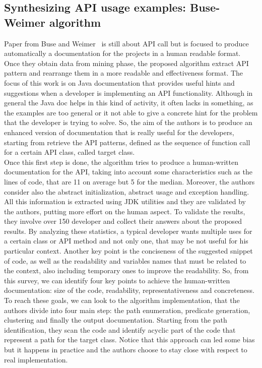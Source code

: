 \subsection{Synthesizing API usage examples: Buse-Weimer algorithm}
Paper from Buse and Weimer~\cite{buse_synthesizing_2012} is still about API call but is focused to produce automatically a documentation for the projects in a human readable format.
Once they obtain data from mining phase, the proposed algorithm extract API pattern and rearrange them in a more readable and effectiveness format. The focus of this work is on Java documentation that provides useful hints and suggestions when a developer is implementing an API functionality. Although in general the Java doc helps in this kind of activity, it often lacks in something, as the examples are too general or it not able to give a concrete hint for the problem that the developer is trying to solve. So, the aim of the authors is to produce an enhanced version of documentation that is really useful for the developers, starting from retrieve the API patterns, defined as the sequence of function call for a certain API class, called target class. \\
Once this first step is done, the algorithm tries to produce a human-written documentation for the API, taking into account some characteristics such as the lines of code, that are 11 on average but 5 for the median. Moreover, the authors consider also the abstract initialization, abstract usage and exception handling. All this information is extracted using JDK utilities and they are validated by the authors, putting more effort on the human aspect. To validate the results, they involve over 150 developer and collect their answers about the proposed results. By analyzing these statistics, a typical developer wants multiple uses for a certain class or API method and not only one, that may be not useful for his particular context. Another key point is the conciseness of the suggested snippet of code, as well as the readability and variables names that must be related to the context, also including temporary ones to improve the readability. So, from this survey, we can identify four key points to achieve the human-written documentation: size of the code, readability, representativeness and concreteness.\newline
To reach these goals, we can look to the algorithm implementation, that the authors divide into four main step: the path enumeration, predicate generation, clustering and finally the output documentation. Starting from the path identification, they scan the code and identify acyclic part of the code that represent a path for the target class. Notice that this approach can led some bias but it happens in practice and the authors choose to stay close with respect to real implementation. \\
